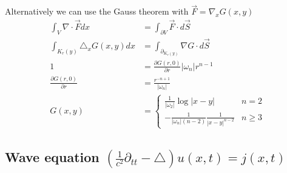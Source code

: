 \documentclass[10pt,a4paper]{book}
\theoremstyle{definition}
\begin{document}
Alternatively we can use the Gauss theorem with $\vec{F}=\nabla_x G(x,y)$
\begin{align}
    \int_V \nabla\cdot \vec{F} dx&=\int_{\partial V} \vec{F}\cdot d\vec{S}\\
    \int_{K_r(y)} \triangle_x G(x,y) dx&=\int_{\partial _{K_r(y)}} \nabla G\cdot d\vec{S}\\
    1&=\frac{\partial G(r,0)}{\partial r}|\omega_{n}|r^{n-1}\\
    \frac{\partial G(r,0)}{\partial r} &= \frac{r^{-n+1}}{|\omega_n|}\\
    G(x,y)&=\left\{\begin{array}{cc}
         \frac{1}{|\omega_2|}\log{|x-y|}                    & n=2  \\
         -\frac{1}{|\omega_n|(n-2)}\frac{1}{|x-y|^{n-2}}    & n\ge3 
    \end{array}\right.
\end{align}

\newpage
\subsection{Wave equation \texorpdfstring{$\left(\frac{1}{c^2}\partial_{tt}-\triangle\right) u(x,t)= j(x,t)$}{TEXT}}
\end{document}
